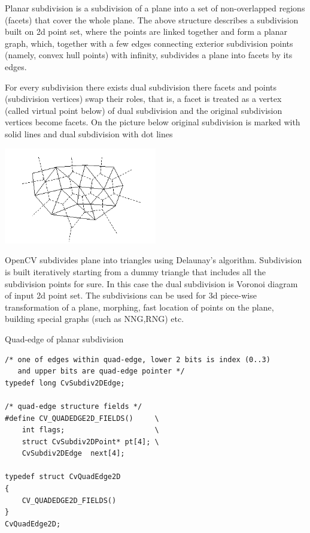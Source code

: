 Planar subdivision is a subdivision of a plane into a set of
non-overlapped regions (facets) that cover the whole plane. The above
structure describes a subdivision built on 2d point set, where the points
are linked together and form a planar graph, which, together with a few
edges connecting exterior subdivision points (namely, convex hull points)
with infinity, subdivides a plane into facets by its edges.

For every subdivision there exists dual subdivision there facets and
points (subdivision vertices) swap their roles, that is, a facet is
treated as a vertex (called virtual point below) of dual subdivision and
the original subdivision vertices become facets. On the picture below
original subdivision is marked with solid lines and dual subdivision
with dot lines

\includegraphics[width=0.5\textwidth]{pics/subdiv.png}

OpenCV subdivides plane into triangles using Delaunay's
algorithm. Subdivision is built iteratively starting from a dummy
triangle that includes all the subdivision points for sure. In this
case the dual subdivision is Voronoi diagram of input 2d point set. The
subdivisions can be used for 3d piece-wise transformation of a plane,
morphing, fast location of points on the plane, building special graphs
(such as NNG,RNG) etc.

\label{CvQuadEdge2D}

Quad-edge of planar subdivision

\begin{lstlisting}
/* one of edges within quad-edge, lower 2 bits is index (0..3)
   and upper bits are quad-edge pointer */
typedef long CvSubdiv2DEdge;

/* quad-edge structure fields */
#define CV_QUADEDGE2D_FIELDS()     \
    int flags;                     \
    struct CvSubdiv2DPoint* pt[4]; \
    CvSubdiv2DEdge  next[4];

typedef struct CvQuadEdge2D
{
    CV_QUADEDGE2D_FIELDS()
}
CvQuadEdge2D;

\end{lstlisting}

